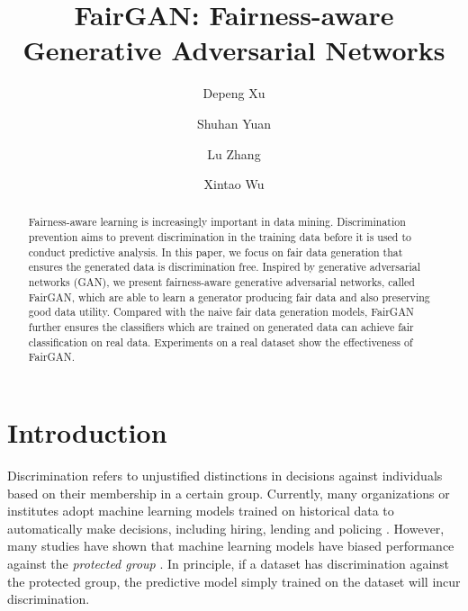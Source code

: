 \documentclass[sigconf]{acmart}
\theoremstyle{definition}
\begin{document}
\title{FairGAN: Fairness-aware Generative Adversarial Networks}

\author{Depeng Xu}
\author{Shuhan Yuan}
\author{Lu Zhang}
\author{Xintao Wu}

\begin{abstract}
Fairness-aware learning is increasingly important in data mining. Discrimination prevention aims to prevent discrimination in the training data before it is used to conduct predictive analysis. In this paper, we focus on fair data generation that ensures the generated data is discrimination free. Inspired by generative adversarial networks (GAN), we present fairness-aware generative adversarial networks, called FairGAN, which are able to learn a generator producing fair data and also preserving good data utility. Compared with the naive fair data generation models, FairGAN further ensures the classifiers which are trained on generated data can achieve fair classification on real data. Experiments on a real dataset show the effectiveness of FairGAN.
\end{abstract}


\maketitle

\section{Introduction}

Discrimination refers to unjustified distinctions in decisions against individuals based on their membership in a certain group. 
Currently, many organizations or institutes adopt machine learning models trained on historical data to automatically make decisions, including hiring, lending and policing \cite{Joseph2016Fairness}.
However, many studies have shown that machine learning models have biased performance against the \textit{protected group} \cite{Beutel2017Data,Binns2017Fairness,Bolukbasi2016Man}. In principle, if a dataset has discrimination against the protected group, the predictive model simply trained on the dataset will incur discrimination. 
\end{document}
